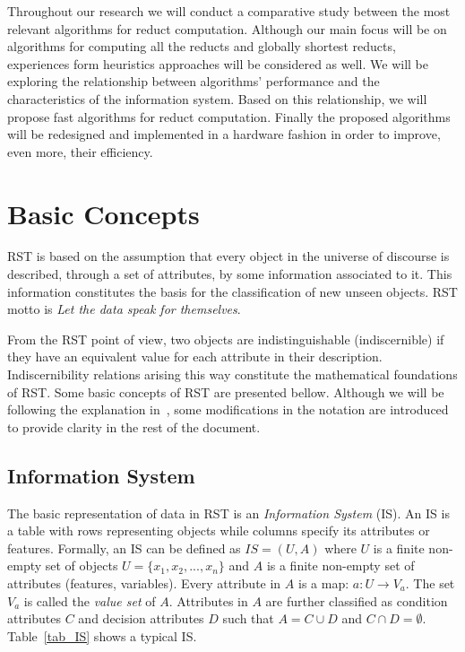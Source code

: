 \documentclass[authoryear,11pt]{elsarticle}
\begin{document}
  Throughout our research we will conduct a comparative study between the most relevant algorithms for reduct 
  computation. Although our main focus will be on algorithms for computing all the reducts and globally shortest
  reducts, experiences form heuristics approaches will be considered as well. We will be exploring the relationship 
  between algorithms' performance and the characteristics of the information system. Based on this relationship,
  we will propose fast algorithms for reduct computation. Finally the proposed algorithms 
  will be redesigned and implemented in a hardware fashion in order to improve, even more, their efficiency.  

\section{Basic Concepts}\label{basicConcepts}
  RST is based on the assumption that every object in the universe of discourse is described, through a 
  set of attributes, by some information associated to it. This information constitutes the basis for the
  classification of new unseen objects. RST motto is \textit{Let the data speak for themselves}.
  
  From the RST point of view, two objects are indistinguishable (indiscernible) if they have an equivalent 
  value for each attribute in their description. Indiscernibility relations arising this way constitute the
  mathematical foundations of RST. 
  Some basic concepts of RST are presented bellow. Although we will be following the explanation 
  in~\citep{Polkowski00}, some modifications in the notation are introduced to provide clarity in the rest 
  of the document.
  
\subsection{Information System}
  The basic representation of data in RST is an \emph{Information System} (IS). An IS is a table with rows
  representing objects while columns specify its attributes or features. Formally, an IS can be defined as 
  $IS=(U,A)$ where $U$ is a finite non-empty set of objects $U=\lbrace x_1,x_2,...,x_n\rbrace$ and $A$ is a 
  finite non-empty set
  of attributes (features, variables). Every attribute in $A$ is a map: $a: U \rightarrow V_a$. The set $V_a$ is
  called the \textit{value set} of $A$. Attributes in $A$ are further classified as condition attributes $C$ and 
  decision attributes $D$ such that $A=C \cup D$ and $C \cap D =\emptyset$. 
  Table~\ref{tab_IS} shows a typical IS.
  
\end{document}
